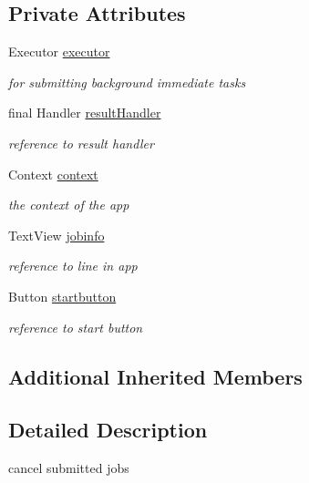 \subsection*{Private Attributes}
\begin{DoxyCompactItemize}
\item 
Executor \mbox{\hyperlink{classcom_1_1example_1_1dmocl_1_1canceljobs_abc0e279999a684fd756e8d4241250daa}{executor}}
\begin{DoxyCompactList}\small\item\em for submitting background immediate tasks \end{DoxyCompactList}\item 
final Handler \mbox{\hyperlink{classcom_1_1example_1_1dmocl_1_1canceljobs_abce3d6cea34caf939e064b0b81ccd9f1}{result\+Handler}}
\begin{DoxyCompactList}\small\item\em reference to result handler \end{DoxyCompactList}\item 
Context \mbox{\hyperlink{classcom_1_1example_1_1dmocl_1_1canceljobs_af7ab7e8cec6d942a27672c51a2334d42}{context}}
\begin{DoxyCompactList}\small\item\em the context of the app \end{DoxyCompactList}\item 
Text\+View \mbox{\hyperlink{classcom_1_1example_1_1dmocl_1_1canceljobs_a2d2bb74bc844f812fd4f941cfe73e6e0}{jobinfo}}
\begin{DoxyCompactList}\small\item\em reference to line in app \end{DoxyCompactList}\item 
Button \mbox{\hyperlink{classcom_1_1example_1_1dmocl_1_1canceljobs_a16903bbf6b7cadae2db338457e1f7057}{startbutton}}
\begin{DoxyCompactList}\small\item\em reference to start button \end{DoxyCompactList}\end{DoxyCompactItemize}
\subsection*{Additional Inherited Members}


\subsection{Detailed Description}
cancel submitted jobs 

